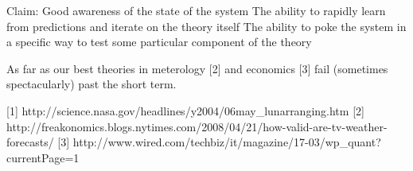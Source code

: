\documentclass{article}
\begin{document}
Claim:
Good awareness of the state of the system
The ability to rapidly learn from predictions and iterate on the theory itself
The ability to poke the system in a specific way to test some particular component of the theory


As far as our best theories in meterology [2] and economics [3] fail (sometimes spectacularly) past the short term.

[1] http://science.nasa.gov/headlines/y2004/06may_lunarranging.htm
[2] http://freakonomics.blogs.nytimes.com/2008/04/21/how-valid-are-tv-weather-forecasts/
[3] http://www.wired.com/techbiz/it/magazine/17-03/wp_quant?currentPage=1


\end{document}
